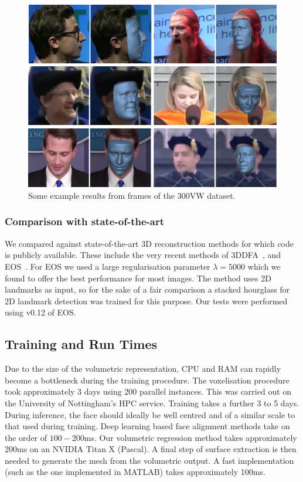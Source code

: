 \begin{figure}
  \centering
  \includegraphics[width=0.9\linewidth]{img/300vw.png}
  \caption[Visual results on the 300VW dataset]{Some example results
    from frames of the 300VW dataset.}
  \label{fig:face300vw}
\end{figure}


\subsubsection{Comparison with state-of-the-art}
We compared against state-of-the-art 3D reconstruction methods for
which code is publicly available. These include the very recent
methods of 3DDFA~\cite{zhu2016face}, and
EOS~\cite{huber2016multiresolution}. For EOS we used a large
regularisation parameter $\lambda = 5000$ which we found to offer the
best performance for most images. The method uses 2D landmarks as
input, so for the sake of a fair comparison a stacked hourglass for 2D
landmark detection was trained for this purpose. Our tests were
performed using v0.12 of EOS.

\subsection{Training and Run Times}

Due to the size of the volumetric representation, CPU and RAM can
rapidly become a bottleneck during the training procedure. The
voxelisation procedure took approximately 3 days using 200 parallel
instances. This was carried out on the University of Nottingham's HPC
service. Training takes a further 3 to 5 days. During inference, the
face should ideally be well centred and of a similar scale to that
used during training. Deep learning based face alignment methods take
on the order of $100-200$ms. Our volumetric regression method takes
approximately 200ms on an NVIDIA Titan X (Pascal). A final step of
surface extraction is then needed to generate the mesh from the
volumetric output. A fast implementation (such as the one implemented
in MATLAB) takes approximately 100ms.

